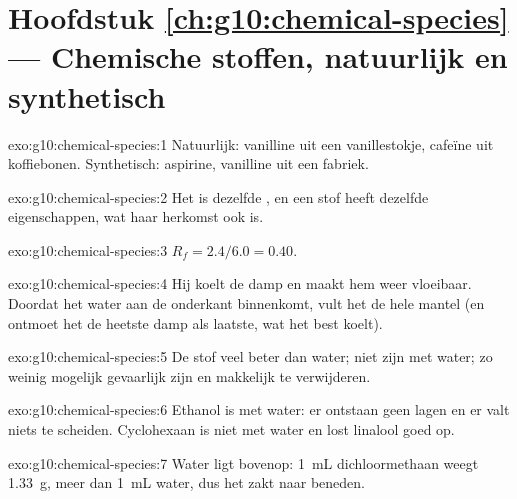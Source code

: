 \section*{Hoofdstuk \ref{ch:g10:chemical-species} --- Chemische stoffen, natuurlijk en synthetisch}

\begin{solution}{exo:g10:chemical-species:1}
Natuurlijk: vanilline uit een vanillestokje, cafeïne uit koffiebonen.
Synthetisch: aspirine, vanilline uit een fabriek.
\end{solution}

\begin{solution}{exo:g10:chemical-species:2}
Het is dezelfde , en een stof heeft dezelfde
eigenschappen, wat haar herkomst ook is.
\end{solution}

\begin{solution}{exo:g10:chemical-species:3}
$R_f = 2.4/6.0 = 0.40$.
\end{solution}

\begin{solution}{exo:g10:chemical-species:4}
Hij koelt de damp en maakt hem weer vloeibaar. Doordat het water aan de
onderkant binnenkomt, vult het de hele mantel (en ontmoet het de heetste
damp als laatste, wat het best koelt).
\end{solution}

\begin{solution}{exo:g10:chemical-species:5}
De stof veel beter  dan water; niet  zijn met water; zo
weinig mogelijk gevaarlijk zijn en makkelijk te verwijderen.
\end{solution}

\begin{solution}{exo:g10:chemical-species:6}
Ethanol is  met water: er ontstaan geen lagen en er valt niets
te scheiden. Cyclohexaan is niet  met water en lost linalool
goed op.
\end{solution}

\begin{solution}{exo:g10:chemical-species:7}
Water ligt bovenop: \qty{1}{mL} dichloormethaan weegt \qty{1.33}{g},
meer dan \qty{1}{mL} water, dus het zakt naar beneden.
\end{solution}

